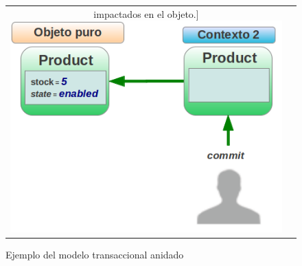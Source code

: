 \begin{figure}[hbt]
\begin{tabular}{cc}
			impactados en el objeto.]{
	    		\includegraphics[scale=0.4]{img/contextoAninado8}
	    	}
			\end{tabular}
		\caption{Ejemplo del modelo transaccional anidado}
		\label{transactionalNestedModel}
	\end{figure}

